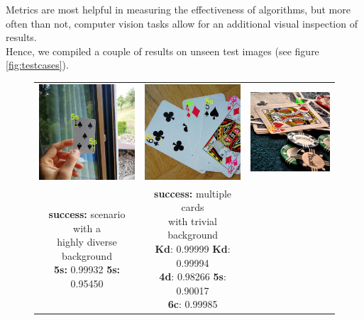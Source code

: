 \documentclass[a4paper]{article}
\begin{document}
Metrics are most helpful in measuring the effectiveness of algorithms, but more often than not, computer vision tasks allow for an additional visual inspection of results. \\Hence, we compiled a couple of results on unseen test images (see figure \ref{fig:testcases}).
\begin{figure}[h]

\begin{tabular}{ccc}

 \includegraphics[width=44mm]{images/success3} &   \includegraphics[width=44mm]{images/success2} &   \includegraphics[width=44mm]{images/success1}\\
\makecell{\textbf{success:} scenario with a \\ highly diverse background \\ \textbf{5s:} 0.99932 \textbf{5s:} 0.95450
}  & \makecell{\textbf{success:}  multiple cards \\ with trivial background \\ \textbf{Kd}: 0.99999 \textbf{Kd}: 0.99994\\
\textbf{4d}: 0.98266
\textbf{5s}: 0.90017\\
\textbf{6c}: 0.99985
}
\end{tabular}
\end{figure}
\end{document}
